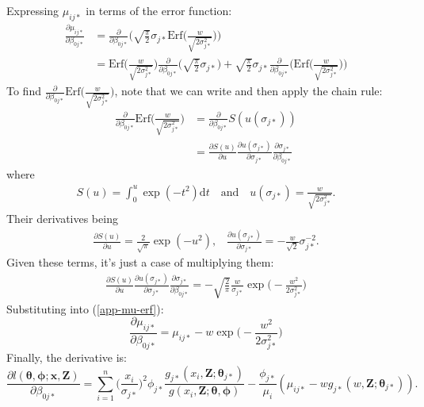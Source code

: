 \documentclass[useAMS,referee, usegraphicx]{biom}
\begin{document}
Expressing $\mu_{ij*}$ in terms of the error function:
\begin{align}
\frac{\partial \mu_{ij*}}{\partial \beta_{0j*}} &= \frac{\partial}{\partial \beta_{0j*}} \Big( \sqrt{\frac{\pi}{2}} \sigma_{j*} \text{Erf}\Big(\frac{w}{\sqrt{2\sigma_{j*}^2}}\Big) \Big)\\
&= \text{Erf}\Big(\frac{w}{\sqrt{2\sigma_{j*}^2}}\Big) \frac{\partial}{\partial \beta_{0j*}} \Big( \sqrt{\frac{\pi}{2}} \sigma_{j*} \Big) + \sqrt{\frac{\pi}{2}} \sigma_{j*} \frac{\partial}{\partial \beta_{0j*}} \Big(\text{Erf}\Big(\frac{w}{\sqrt{2\sigma_{j*}^2}}\Big) \Big)
\label{app-mu-erf}
\end{align}
To find $\frac{\partial}{\partial \beta_{0j*}} \text{Erf}\Big(\frac{w}{\sqrt{2\sigma_{j*}^2}}\Big)$, note that we can write and then apply the chain rule:
\begin{align*}
\frac{\partial}{\partial \beta_{0j*}} \text{Erf}\Big(\frac{w}{\sqrt{2\sigma_{j*}^2}}\Big) &= \frac{\partial}{\partial \beta_{0j*}} S(u(\sigma_{j*}))\\
&= \frac{\partial S(u)}{\partial u} \frac{\partial u(\sigma_{j*})}{\partial \sigma_{j*} } \frac{\partial \sigma_{j*}}{\partial \beta_{0j*}}
\end{align*}
where 
\begin{align*}
S(u) = \int_0^{u} \exp(-t^2) \text{d}t \quad \text{and} \quad u(\sigma_{j*})=\frac{w}{\sqrt{2\sigma_{j*}^2}}.
\end{align*}
Their derivatives being
\begin{align*}
\frac{\partial S(u)}{\partial u} = \frac{2}{\sqrt{\pi}} \exp(-u^2) \text{,} \quad \frac{\partial u(\sigma_{j*})}{\partial \sigma_{j*}} = -\frac{w}{\sqrt{2}}\sigma_{j*}^{-2}.
\end{align*}
Given these terms, it's just a case of multiplying them:
\begin{align*}
\frac{\partial S(u)}{\partial u} \frac{\partial u(\sigma_{j*})}{\partial \sigma_{j*} } \frac{\partial \sigma_{j*}}{\partial \beta_{0j*}} = - \sqrt{\frac{2}{\pi}} \frac{w}{\sigma_{j*}} \exp\Big( -\frac{w^2}{2\sigma_{j*}^2} \Big)
\end{align*}
Substituting into (\ref{app-mu-erf}):
\begin{equation*}
\frac{\partial \mu_{ij*}}{\partial \beta_{0j*}} =  \mu_{ij*} - w \exp\Big( -\frac{w^2}{2\sigma_{j*}^2} \Big)
\end{equation*}
Finally, the derivative is:
\begin{equation*}
\frac{\partial l(\bm{\theta}, \bm{\phi}; \mathbf{x},\mathbf{Z})}{\partial \beta_{0j*}} = \sum_{i=1}^n \Big( \frac{x_i}{\sigma_{j*}}\Big)^2 \phi_{j*} \frac{g_{j*}(x_i,\mathbf{Z}; \bm{\theta}_{j*})}{g(x_i,\mathbf{Z}; \bm{\theta},\bm{\phi})}  - \frac{\phi_{j*}}{\mu_i} (\mu_{ij*} - w g_{j*}(w,\mathbf{Z}; \bm{\theta}_{j*})).
\end{equation*}
\end{document}
